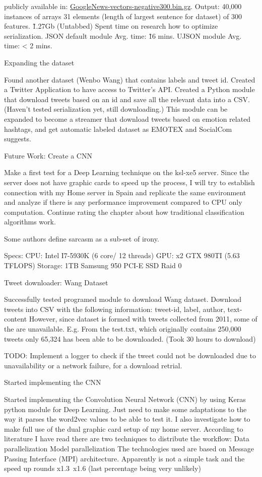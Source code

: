 publicly available in: \href{https://drive.google.com/file/d/0B7XkCwpI5KDYNlNUTTlSS21pQmM/edit?usp=sharing}{GoogleNews-vectors-negative300.bin.gz}.
Output: 40,000 instances of arrays 31 elements (length of largest sentence for dataset) of 300 features. \~1.27Gb (Untabbed)
Spent time on research how to optimize serialization.
JSON default module Avg. time: \~ 16 mins.
UJSON module Avg. time: < 2 mins.

Expanding the dataset

Found another dataset (Wenbo Wang) that contains labels and tweet id.
Created a Twitter Application to have access to Twitter’s API.
Created a Python module that download tweets based on an id and save all the relevant data into a CSV. (Haven’t tested serialization yet, still downloading.)
This module can be expanded to become a streamer that download tweets based on emotion related hashtags, and get automatic labeled dataset as EMOTEX and SocialCom suggests.

Future Work: Create a CNN

Make a first test for a Deep Learning technique on the ksl-xe5 server.
Since the server does not have graphic cards to speed up the process, I will try to establish connection with my Home server in Spain and replicate the same environment and analyze if there is any performance improvement compared to CPU only computation.
Continue rating the chapter about how traditional classification algorithms work.

Some authors define sarcasm as a sub-set of irony.

Specs:
CPU: Intel I7-5930K (6 core/ 12 threads)
GPU: x2 GTX 980TI (5.63 TFLOPS)
Storage: 1TB Samsung 950 PCI-E SSD Raid 0

Tweet downloader: Wang Dataset

Successfully tested programed module to download Wang dataset. Download tweets into CSV with the following information:
tweet-id, label, author, text-content
However, since dataset is formed with tweets collected from 2011, some of the are unavailable. E.g. From the test.txt, which originally contains 250,000 tweets only 65,324 has been able to be downloaded. (Took 30 hours to download)

TODO: Implement a logger to check if the tweet could not be downloaded due to unavailability or a network failure, for a download retrial.

Started implementing the CNN

Started implementing the Convolution Neural Network (CNN) by using Keras\cite{keras} python module for Deep Learning.
Just need to make some adaptations to the way it parses the word2vec values to be able to test it.
I also investigate how to make full use of the dual graphic card setup of my home server. According to literature I have read there are two techniques to distribute the workflow:
Data parallelization
Model parallelization
The technologies used are based on Message Passing Interface (MPI) architecture. Apparently is not a simple task and the speed up rounds x1.3~x1.6 (last percentage being very unlikely)

